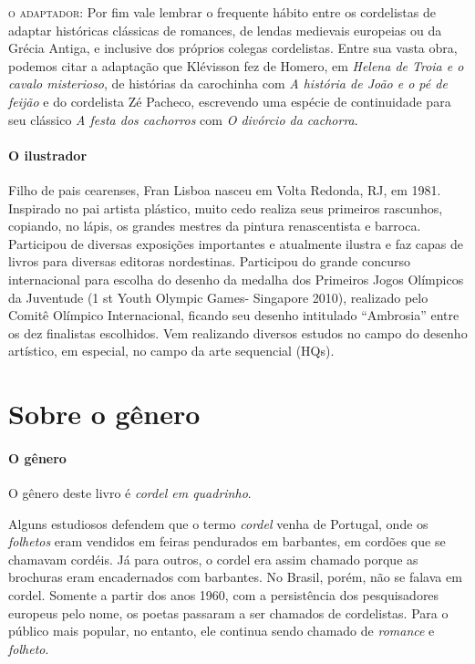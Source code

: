 \documentclass[11pt]{extarticle}
\begin{document}
\noindent\textsc{o adaptador}: Por fim vale lembrar o frequente hábito entre os cordelistas de adaptar históricas clássicas de romances, de lendas medievais europeias ou da Grécia Antiga, e inclusive dos próprios colegas cordelistas. Entre sua vasta obra, podemos citar a adaptação que Klévisson fez de Homero, em \textit{Helena de Troia e o cavalo misterioso}, de histórias da carochinha com \textit{A história de João e o pé de feijão} e do cordelista Zé Pacheco, escrevendo uma espécie de continuidade para seu clássico \textit{A festa dos cachorros} com \textit{O divórcio da cachorra}.

\paragraph{O ilustrador}
Filho de pais cearenses, Fran Lisboa nasceu em Volta Redonda, RJ, em 1981. Inspirado no pai artista plástico, muito cedo realiza seus primeiros rascunhos, copiando, no lápis, os grandes mestres da pintura renascentista e barroca. Participou de diversas exposições importantes e atualmente ilustra e faz capas de livros para diversas editoras nordestinas. Participou do grande concurso internacional para escolha do desenho da medalha dos Primeiros Jogos Olímpicos da Juventude (1 st Youth Olympic Games- Singapore 2010), realizado pelo Comitê Olímpico Internacional, ficando seu desenho intitulado “Ambrosia” entre os dez finalistas escolhidos. Vem realizando diversos estudos no campo do desenho artístico, em especial, no campo da arte sequencial (HQs).


\section{Sobre o gênero}

\paragraph{O gênero} O gênero deste livro é \textit{cordel em quadrinho}. 



Alguns estudiosos defendem que o termo \textit{cordel} venha de Portugal, onde os \textit{folhetos} eram vendidos em feiras pendurados em barbantes, em cordões que se chamavam cordéis. Já para outros, o cordel era assim chamado porque as brochuras eram encadernados com barbantes. No Brasil, porém, não se falava em cordel. Somente a partir dos anos 1960, com a persistência dos pesquisadores europeus pelo nome, os poetas passaram a ser chamados de cordelistas. Para o público mais popular, no entanto, ele continua sendo chamado de \textit{romance} e \textit{folheto}.
\end{document}
